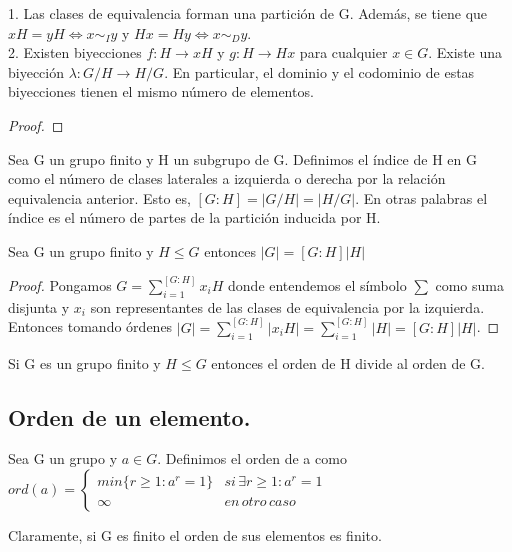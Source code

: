 \begin{proposition}
1. Las clases de equivalencia forman una partición de G. Además, se tiene que $xH = yH \iff x \sim_{I} y$ y $Hx = Hy \iff x \sim_{D} y$. \\
2. Existen biyecciones $f:H \rightarrow xH$ y $g:H \rightarrow Hx$ para cualquier $x \in G$. Existe una biyección $\lambda:G/H \rightarrow H/G$. En particular, el dominio y el codominio de estas biyecciones tienen el mismo número de elementos.
\end{proposition}

\begin{proof}

\end{proof}

\begin{definition}
Sea G un grupo finito y H un subgrupo de G. Definimos el índice de H en G como el número de clases laterales a izquierda o derecha por la relación equivalencia anterior. Esto es, $[G:H] = |G/H| = |H/G|$. En otras palabras el índice es el número de partes de la partición inducida por H.
\end{definition}

\begin{theorem}
Sea G un grupo finito y $H \le G$ entonces $|G| = [G:H]|H|$
\end{theorem}

\begin{proof}
Pongamos $G = \sum_{i=1}^{[G:H]} x_iH$ donde entendemos el símbolo $\sum$ como suma disjunta y $x_i$ son representantes de las clases de equivalencia por la izquierda. Entonces tomando órdenes $|G| = \sum_{i=1}^{[G:H]} |x_iH| =  \sum_{i=1}^{[G:H]} |H| = [G:H]|H|$.
\end{proof}

\begin{corollary}
Si G es un grupo finito y $H \le G$ entonces el orden de H divide al orden de G. 
\end{corollary}

\subsection{Orden de un elemento.}

\begin{definition}
Sea G un grupo y $a \in G$. Definimos el orden de a como 
$ord(a) = 
\begin{cases}
min\{r \ge 1:a^r = 1	\} & si \, \exists r \ge 1 : a^r = 1 \\
\infty & en \, otro \, caso
\end{cases}$

Claramente, si G es finito el orden de sus elementos es finito.
\end{definition}

